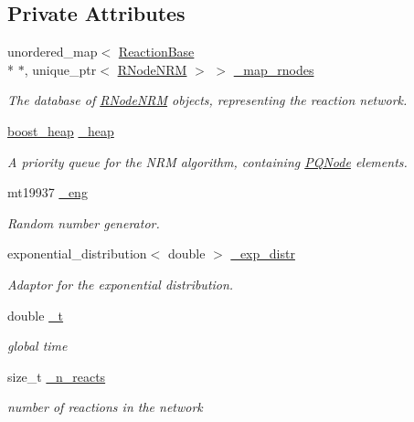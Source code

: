 \subsection*{Private Attributes}
\begin{DoxyCompactItemize}
\item 
unordered\+\_\+map$<$ \hyperlink{classReactionBase}{Reaction\+Base} \\*
$\ast$, unique\+\_\+ptr$<$ \hyperlink{classRNodeNRM}{R\+Node\+N\+R\+M} $>$ $>$ \hyperlink{classChemNRMImpl_a187b7d9676fc00d2e9aa59a26db1adb0}{\+\_\+map\+\_\+rnodes}
\begin{DoxyCompactList}\small\item\em The database of \hyperlink{classRNodeNRM}{R\+Node\+N\+R\+M} objects, representing the reaction network. \end{DoxyCompactList}\item 
\hyperlink{ChemNRMImpl_8h_a57f859851909ca786c37681af9b01d45}{boost\+\_\+heap} \hyperlink{classChemNRMImpl_aae97d56d3951afd82e9d017762eeec62}{\+\_\+heap}
\begin{DoxyCompactList}\small\item\em A priority queue for the N\+R\+M algorithm, containing \hyperlink{classPQNode}{P\+Q\+Node} elements. \end{DoxyCompactList}\item 
mt19937 \hyperlink{classChemNRMImpl_a1d90a1097fe3ff8fca3eb5da4828d292}{\+\_\+eng}
\begin{DoxyCompactList}\small\item\em Random number generator. \end{DoxyCompactList}\item 
exponential\+\_\+distribution$<$ double $>$ \hyperlink{classChemNRMImpl_af0e23969dfefcde35cf878c15e950300}{\+\_\+exp\+\_\+distr}
\begin{DoxyCompactList}\small\item\em Adaptor for the exponential distribution. \end{DoxyCompactList}\item 
double \hyperlink{classChemNRMImpl_a87649ab485a12e3af036913033ee7ca2}{\+\_\+t}
\begin{DoxyCompactList}\small\item\em global time \end{DoxyCompactList}\item 
size\+\_\+t \hyperlink{classChemNRMImpl_acbb18690cfdd71dd4be01747aaf169d0}{\+\_\+n\+\_\+reacts}
\begin{DoxyCompactList}\small\item\em number of reactions in the network \end{DoxyCompactList}\end{DoxyCompactItemize}


